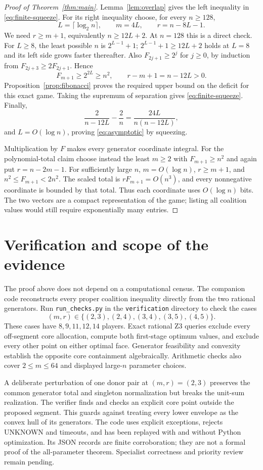 \documentclass[11pt]{article}
\begin{document}
\begin{proof}[Proof of Theorem~\ref{thm:main}]
Lemma~\ref{lem:overlap} gives the left inequality in
\eqref{eq:finite-squeeze}. For its right inequality choose, for every
$n\ge128$,
\[
 L=\lceil\log_2 n\rceil,\qquad m=4L,\qquad r=n-8L-1.
\]
We need $r\ge m+1$, equivalently $n\ge12L+2$. At $n=128$ this is a
direct check. For $L\ge8$, the least possible $n$ is $2^{L-1}+1$;
$2^{L-1}+1\ge12L+2$ holds at $L=8$ and its left side grows faster
thereafter. Also $F_{2j+1}\ge2^j$ for $j\ge0$, by induction from
$F_{2j+3}\ge2F_{2j+1}$. Hence
\[
 F_{m+1}\ge2^{2L}\ge n^2,\qquad r-m+1=n-12L>0.
\]
Proposition~\ref{prop:fibonacci} proves the required upper bound on the
deficit for this exact game. Taking the supremum of separation gives
\eqref{eq:finite-squeeze}. Finally,
\[
 \frac2{n-12L}-\frac2n=\frac{24L}{n(n-12L)},
\]
and $L=O(\log n)$, proving \eqref{eq:asymptotic} by squeezing.

Multiplication by $F$ makes every generator coordinate integral. For the
polynomial-total claim choose instead the least $m\ge2$ with
$F_{m+1}\ge n^2$ and again put $r=n-2m-1$. For sufficiently large $n$,
$m=O(\log n)$, $r\ge m+1$, and
$n^2\le F_{m+1}<2n^2$. The scaled total is $rF_{m+1}=O(n^3)$, and
every nonnegative coordinate is bounded by that total. Thus each coordinate
uses $O(\log n)$ bits. The two vectors are a compact representation of
the game; listing all coalition values would still require exponentially
many entries.
\end{proof}

\section{Verification and scope of the evidence}

The proof above does not depend on a computational census.
The companion code reconstructs every proper coalition inequality directly
from the two rational generators. Run \texttt{run\_checks.py} in the
\texttt{verification} directory to check the cases
\[
 (m,r)\in\{(2,3),(2,4),(3,4),(3,5),(4,5)\}.
\]
These cases have $8,9,11,12,14$ players. Exact rational Z3 queries exclude
every off-segment core allocation, compute both first-stage optimum values,
and exclude every other point on either optimal face. Generator feasibility
and convexity establish the opposite core containment algebraically.
Arithmetic checks also cover $2\le m\le64$ and displayed large-$n$
parameter choices.

A deliberate perturbation of one donor pair at $(m,r)=(2,3)$ preserves
the common generator total and singleton normalization but breaks the
unit-sum realization. The verifier finds and checks an explicit core point
outside the proposed segment. This guards against treating every lower
envelope as the convex hull of its generators. The code uses explicit
exceptions, rejects UNKNOWN and timeouts, and has been replayed with and
without Python optimization. Its JSON records are finite corroboration;
they are not a formal proof of the all-parameter theorem. Specialist
correctness and priority review remain pending.
\end{document}

